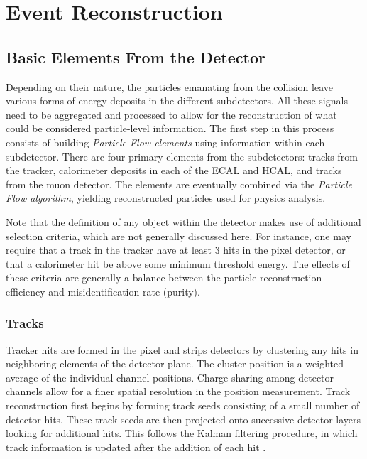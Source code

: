 \chapter{Event Reconstruction}
\label{chap:eventreco}

\section{Basic Elements From the Detector} 

Depending on their nature, the particles emanating from the collision leave various forms of energy deposits in the different subdetectors. All these signals need to be aggregated and processed to allow for the reconstruction of what could be considered particle-level information. The first step in this process consists of building \textit{Particle Flow elements} using information within each subdetector. There are four primary elements from the subdetectors: tracks from the tracker, calorimeter deposits in each of the ECAL and HCAL, and tracks from the muon detector. The elements are eventually combined via the \textit{Particle Flow algorithm}, yielding reconstructed particles used for physics analysis.

Note that the definition of any object within the detector makes use of additional selection criteria, which are not generally discussed here. For instance, one may require that a track in the tracker have at least 3 hits in the pixel detector, or that a calorimeter hit be above some minimum threshold energy. The effects of these criteria are generally a balance between the particle reconstruction efficiency and misidentification rate (purity).

\subsection{Tracks}%

Tracker hits are formed in the pixel and strips detectors by clustering any hits in neighboring elements of the detector plane. The cluster position is a weighted average of the individual channel positions. Charge sharing among detector channels allow for a finer spatial resolution in the position measurement. Track reconstruction first begins by forming track seeds consisting of a small number of detector hits. These track seeds are then projected onto successive detector layers looking for additional hits. This follows the Kalman filtering procedure, in which track information is updated after the addition of each hit \cite{trackerreco}.
 
